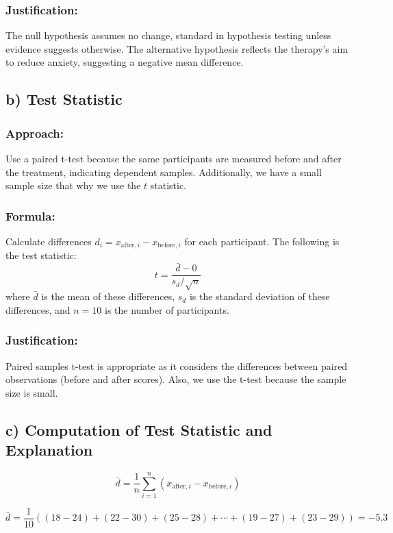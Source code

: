 \documentclass{article}
\begin{document}
\subsubsection*{Justification:}
The null hypothesis assumes no change, standard in hypothesis testing unless evidence suggests otherwise. The alternative hypothesis reflects the therapy's aim to reduce anxiety, suggesting a negative mean difference.

\subsection*{b) Test Statistic}

\subsubsection*{Approach:}
Use a paired t-test because the same participants are measured before and after the treatment, indicating dependent samples. Additionally, we have a small sample size that why we use the $t$ statistic.

\subsubsection*{Formula:}
Calculate differences \( d_i = x_{\text{after},i} - x_{\text{before},i} \) for each participant. The following is the test statistic:
\[
t = \frac{\bar{d} - 0}{s_d / \sqrt{n}}
\]
where \( \bar{d} \) is the mean of these differences, \( s_d \) is the standard deviation of these differences, and \( n = 10 \) is the number of participants.

\subsubsection*{Justification:}
Paired samples t-test is appropriate as it considers the differences between paired observations (before and after scores). Also, we use the t-test because the sample size is small.

\subsection*{c) Computation of Test Statistic and Explanation}

\[
\bar{d} = \frac{1}{n} \sum_{i=1}^{n} (x_{\text{after},i} - x_{\text{before},i})
\]


\[
\bar{d} = \frac{1}{10} \left( (18 - 24) + (22 - 30) + (25 - 28) + \cdots  + (19 - 27) + (23 - 29) \right) = -5.3
\]
\end{document}
